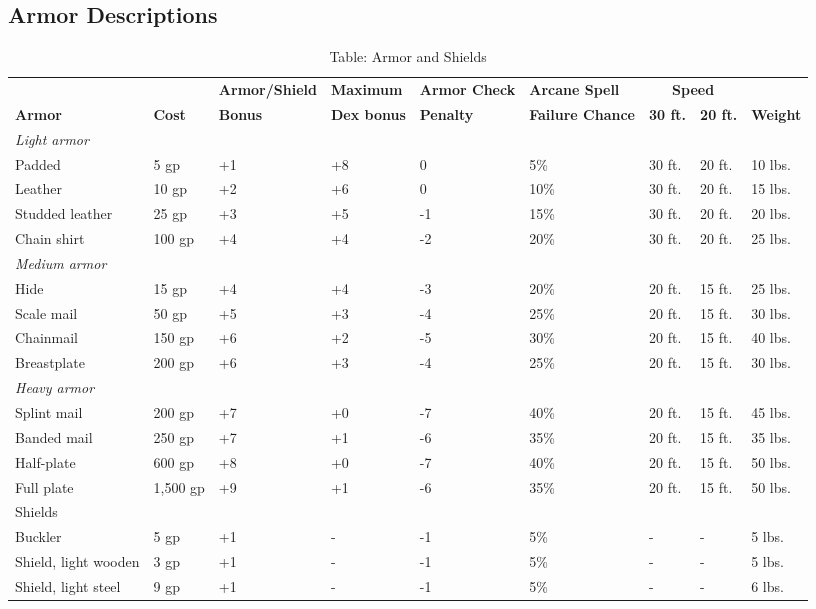 \subsection{Armor Descriptions}

\begin{table*}[]
\sffamily
\caption{Table: Armor and Shields}
\begin{tabular}{lllllllll}
                        &      & \textbf{Armor/Shield} & \textbf{Maximum} & \textbf{Armor Check} & \textbf{Arcane Spell} & \multicolumn{2}{c}{\textbf{Speed}} &  \\
\textbf{Armor} & \textbf{Cost} & \textbf{Bonus}        & \textbf{Dex bonus} & \textbf{Penalty}   & \textbf{Failure Chance} & \textbf{30 ft.} & \textbf{20 ft.} & \textbf{Weight}\\
\textit{Light armor} \\
 Padded& 5 gp& +1& +8& 0& 5\%& 30 ft.& 20 ft.& 10 lbs. \\
 Leather& 10 gp& +2& +6& 0& 10\%& 30 ft.& 20 ft.& 15 lbs. \\
 Studded leather& 25 gp& +3& +5& -1& 15\%& 30 ft.& 20 ft.& 20 lbs. \\
 Chain shirt& 100 gp& +4& +4& -2& 20\%& 30 ft.& 20 ft.& 25 lbs. \\
\textit{Medium armor}   \\
 Hide& 15 gp& +4& +4& -3& 20\%& 20 ft.& 15 ft.& 25 lbs. \\
 Scale mail& 50 gp& +5& +3& -4& 25\%& 20 ft.& 15 ft.& 30 lbs. \\
 Chainmail& 150 gp& +6& +2& -5& 30\%& 20 ft.& 15 ft.& 40 lbs. \\
 Breastplate& 200 gp& +6& +3& -4& 25\%& 20 ft.& 15 ft.& 30 lbs. \\
\textit{Heavy armor}   \\
 Splint mail& 200 gp& +7& +0& -7& 40\%& 20 ft.& 15 ft.& 45 lbs. \\
 Banded mail& 250 gp& +7& +1& -6& 35\%& 20 ft.& 15 ft.& 35 lbs. \\
 Half-plate& 600 gp& +8& +0& -7& 40\%& 20 ft.& 15 ft.& 50 lbs. \\
 Full plate& 1,500 gp& +9& +1& -6& 35\%& 20 ft.& 15 ft.& 50 lbs. \\
 Shields   \\
 Buckler& 5 gp& +1& -& -1& 5\%& -& -& 5 lbs. \\
 Shield, light wooden& 3 gp& +1& -& -1& 5\%& -& -& 5 lbs. \\
 Shield, light steel& 9 gp& +1& -& -1& 5\%& -& -& 6 lbs. \\

\end{tabular}
\end{table*}
